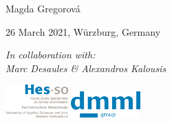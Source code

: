\documentclass[smaller]{beamer}
\begin{document}
{%

\begin{frame}
\center
\vspace{1em}
{\LARGE{}}

\vspace{2em}
{\large Magda Gregorov\'a}

\vspace{1em}
26 March 2021, W\"urzburg, Germany

\vspace{2em}
{\small\textit{In collaboration with:\\
Marc Desaules \& Alexandros Kalousis}}

\vfill
\includegraphics[width=0.18\textwidth]{HesLogo}
\hfill
\includegraphics[width=0.2\textwidth]{dmml_logo_MGblue}

\end{frame}

}
\addtocounter{framenumber}{-1}

\end{document}
